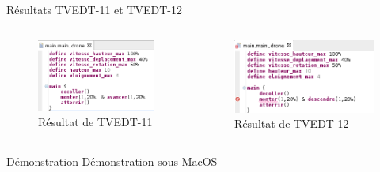 \documentclass{bredelebeamer}
\begin{document}
\begin{frame}{Résultats TVEDT-11 et TVEDT-12} 
\begin{columns}
\begin{column}{0.5\textwidth}
\begin{figure}
\centering
\includegraphics[scale=0.4]{images/TVEDT-11.png}
\caption{Résultat de TVEDT-11}
\end{figure}
\end{column}
\begin{column}{0.5\textwidth}
\begin{figure}
\centering
\includegraphics[scale=0.43]{images/TVEDT-12.png}
\caption{Résultat de TVEDT-12}
\end{figure}
\end{column}
\end{columns}
\end{frame}

\begin{frame}{Démonstration} 
\center Démonstration sous MacOS


\end{frame}
\end{document}
